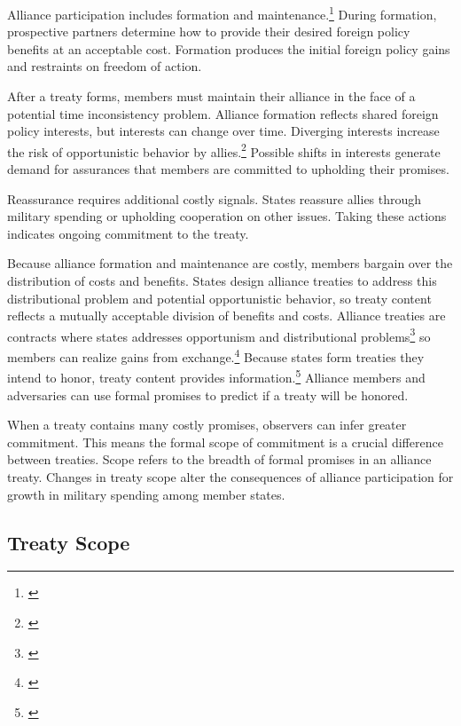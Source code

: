 \documentclass[12pt]{article}
\begin{document}
Alliance participation includes formation and maintenance.\footnote{\citep{Snyder1997}}
During formation, prospective partners determine how to provide their desired foreign policy benefits at an acceptable cost. 
Formation produces the initial foreign policy gains and restraints on freedom of action. 


After a treaty forms, members must maintain their alliance in the face of a potential time inconsistency problem. 
Alliance formation reflects shared foreign policy interests, but interests can change over time. 
Diverging interests increase the risk of opportunistic behavior by allies.\footnote{\citep{Leeds2003a, LeedsSavun2007}}
Possible shifts in interests generate demand for assurances that members are committed to upholding their promises. 


Reassurance requires additional costly signals. 
States reassure allies through military spending or upholding cooperation on other issues.
Taking these actions indicates ongoing commitment to the treaty. 


Because alliance formation and maintenance are costly, members bargain over the distribution of costs and benefits.
States design alliance treaties to address this distributional problem and potential opportunistic behavior, so treaty content reflects a mutually acceptable division of benefits and costs. 
Alliance treaties are contracts where states addresses opportunism and distributional problems\footnote{\citep{Williamson1985, Koremenosetal2001}} so members can realize gains from exchange.\footnote{\citep{Lake1996, Bensonetal2014}}
Because states form treaties they intend to honor, treaty content provides information.\footnote{\citep{Leeds2003}}
Alliance members and adversaries can use formal promises to predict if a treaty will be honored.


When a treaty contains many costly promises, observers can infer greater commitment. 
This means the formal scope of commitment is a crucial difference between treaties.
Scope refers to the breadth of formal promises in an alliance treaty.
Changes in treaty scope alter the consequences of alliance participation for growth in military spending among member states. 



\subsection{Treaty Scope}
\end{document}
